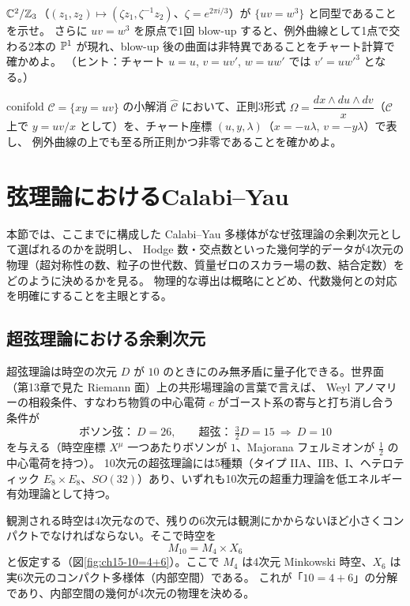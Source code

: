 $\mathbb{C}^2/\mathbb{Z}_3$（$(z_1,z_2)\mapsto(\zeta z_1,\zeta^{-1}z_2)$、$\zeta = e^{2\pi i/3}$）が $\{uv = w^3\}$ と同型であることを示せ。
さらに $uv = w^3$ を原点で1回 blow-up すると、例外曲線として1点で交わる2本の $\mathbb{P}^1$ が現れ、blow-up 後の曲面は非特異であることをチャート計算で確かめよ。
（ヒント：チャート $u = u$, $v = uv'$, $w = uw'$ では $v' = uw'^3$ となる。）

conifold $\mathcal C = \{xy = uv\}$ の小解消 $\hat{\mathcal C}$ において、正則3形式
$\Omega = \dfrac{dx\wedge du\wedge dv}{x}$（$\mathcal C$ 上で $y = uv/x$ として）を、チャート座標 $(u,y,\lambda)$（$x = -u\lambda$, $v = -y\lambda$）で表し、
例外曲線の上でも至る所正則かつ非零であることを確かめよ。

\section{弦理論におけるCalabi--Yau}

本節では、ここまでに構成した Calabi--Yau 多様体がなぜ弦理論の余剰次元として選ばれるのかを説明し、
Hodge 数・交点数といった幾何学的データが4次元の物理（超対称性の数、粒子の世代数、質量ゼロのスカラー場の数、結合定数）をどのように決めるかを見る。
物理的な導出は概略にとどめ、代数幾何との対応を明確にすることを主眼とする。

\subsection{超弦理論における余剰次元}

超弦理論は時空の次元 $D$ が $10$ のときにのみ無矛盾に量子化できる。世界面（第13章で見た Riemann 面）上の共形場理論の言葉で言えば、
Weyl アノマリーの相殺条件、すなわち物質の中心電荷 $c$ がゴースト系の寄与と打ち消し合う条件が
\[
\text{ボソン弦：}\ D = 26,\qquad\text{超弦：}\ \tfrac32D = 15\ \Longrightarrow\ D = 10
\]
を与える（時空座標 $X^\mu$ 一つあたりボソンが $1$、Majorana フェルミオンが $\frac12$ の中心電荷を持つ）。
10次元の超弦理論には5種類（タイプ IIA、IIB、I、ヘテロティック $E_8\times E_8$、$SO(32)$）あり、いずれも10次元の超重力理論を低エネルギー有効理論として持つ。

観測される時空は4次元なので、残りの6次元は観測にかからないほど小さくコンパクトでなければならない。そこで時空を
\[
M_{10} = M_4\times X_6
\]
と仮定する（図\ref{fig:ch15-10=4+6}）。ここで $M_4$ は4次元 Minkowski 時空、$X_6$ は実6次元のコンパクト多様体（内部空間）である。
これが「$10 = 4+6$」の分解であり、内部空間の幾何が4次元の物理を決める。

